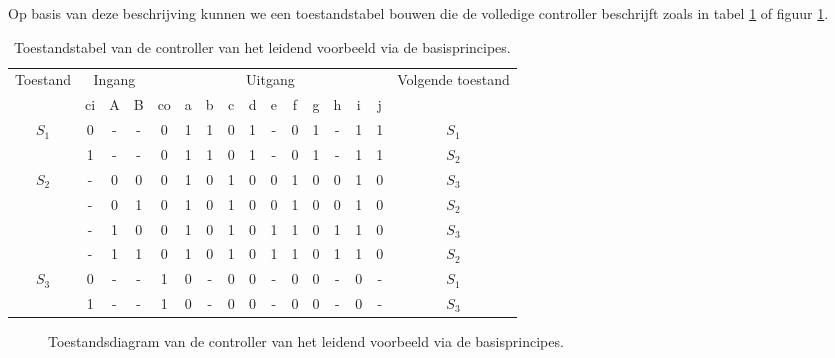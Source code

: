 Op basis van deze beschrijving kunnen we een toestandstabel bouwen die de volledige controller beschrijft zoals in tabel \ref{tbl:sprocessorControllerGenericLeadingExample} of figuur \ref{fig:sprocessorControllerGenericLeadingExample}.
\begin{table}[hbt]
\centering
\begin{tabular}{c|ccc|ccccccccccc|c}
\multirow{2}{*}{Toestand}&\multicolumn{3}{c|}{Ingang}&\multicolumn{11}{c|}{Uitgang}&\multirow{2}{*}{Volgende toestand}\\
&ci&A&B&co&a&b&c&d&e&f&g&h&i&j&\\\hline
\multirow{2}{*}{$S_1$}
&0&-&-&		0	&1&1	&0&1&-	&0&1&-	&1&1	&$S_1$\\
&1&-&-&		0	&1&1	&0&1&-	&0&1&-	&1&1	&$S_2$\\\hline
\multirow{4}{*}{$S_2$}
&-&0&0&		0	&1&0	&1&0&0	&1&0&0	&1&0	&$S_3$\\
&-&0&1&		0	&1&0	&1&0&0	&1&0&0	&1&0	&$S_2$\\
&-&1&0&		0	&1&0	&1&0&1	&1&0&1	&1&0	&$S_3$\\
&-&1&1&		0	&1&0	&1&0&1	&1&0&1	&1&0	&$S_2$\\\hline
\multirow{2}{*}{$S_3$}
&0&-&-&		1	&0&-	&0&0&-	&0&0&-	&0&-	&$S_1$\\
&1&-&-&		1	&0&-	&0&0&-	&0&0&-	&0&-	&$S_3$\\
\end{tabular}
\caption{Toestandstabel van de controller van het leidend voorbeeld via de basisprincipes.}
\label{tbl:sprocessorControllerGenericLeadingExample}
\end{table}
\begin{figure}[hbt]
\centering
{}
\caption{Toestandsdiagram van de controller van het leidend voorbeeld via de basisprincipes.}
\label{fig:sprocessorControllerGenericLeadingExample}
\end{figure}
